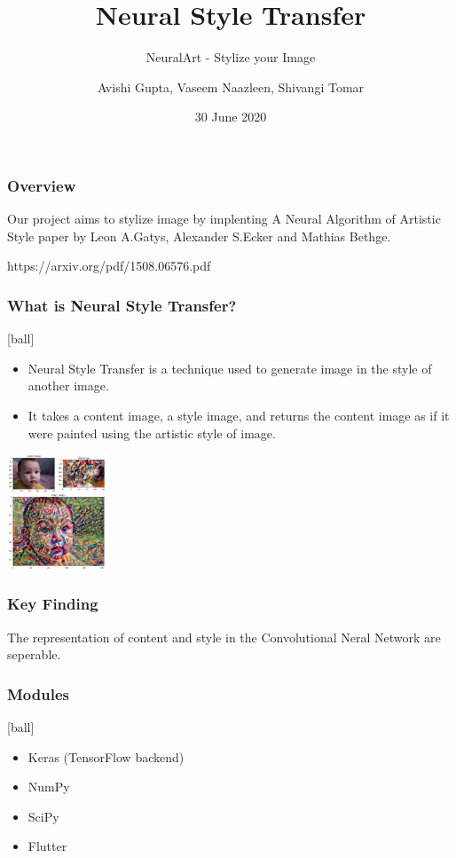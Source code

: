 \documentclass[14pt]{beamer}
\title[NST]{Neural Style Transfer}
\subtitle{NeuralArt - Stylize your Image}
\author[Team - 38]{Avishi Gupta, Vaseem Naazleen, Shivangi Tomar}
\date{30 June 2020}
\begin{document}
\begin{frame}
   \titlepage
\end{frame}

\begin{frame}
		\frametitle{Overview}
		Our project aims to stylize image by implenting A Neural Algorithm of Artistic Style paper by Leon A.Gatys, Alexander S.Ecker and Mathias Bethge.
        
		https://arxiv.org/pdf/1508.06576.pdf
\end{frame}

\begin{frame}
		\frametitle{What is Neural Style Transfer?}
		\begin{itemize}
		\item Neural Style Transfer is a technique used to generate image in the style of another image.
		\item It takes a content image, a style image, and returns the content image as if it were painted using the artistic style of image.
		\end{itemize}
        \begin{center}
		    \includegraphics[width=30mm]{image.jpg}
        \end{center}
\end{frame}

\begin{frame}
		\frametitle{Key Finding}
		The representation of content and style in the Convolutional Neral Network are seperable.
\end{frame}

\begin{frame}
		\frametitle{Modules}
		\begin{itemize}
		\item Keras (TensorFlow backend)
		\item NumPy
		\item SciPy
		\item Flutter
		\end{itemize}
\end{frame}
\end{document}
